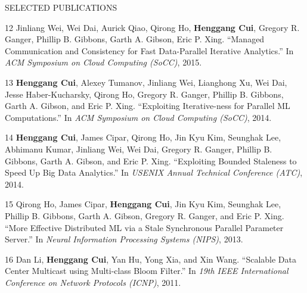 \documentclass{resume} %
\begin{document}
\begin{rSection}{SELECTED PUBLICATIONS}
{    \item
    [12]
        Jinliang Wei, Wei Dai, Aurick Qiao, Qirong Ho, {\bf Henggang Cui}, Gregory R. Ganger, Phillip B. Gibbons, Garth A. Gibson, Eric P. Xing.
        ``Managed Communication and Consistency for Fast Data-Parallel Iterative Analytics.''
        In \emph{ACM Symposium on Cloud Computing (SoCC)}, 2015.
    \item
    [13]
        {\bf Henggang Cui}, Alexey Tumanov, Jinliang Wei, Lianghong Xu, Wei Dai, Jesse Haber-Kucharsky, Qirong Ho, Gregory R. Ganger, Phillip B. Gibbons, Garth A. Gibson, and Eric P. Xing.
        ``Exploiting Iterative-ness for Parallel ML Computations.''
        In \emph{ACM Symposium on Cloud Computing (SoCC)}, 2014.
    \item
    [14]
        {\bf Henggang Cui}, James Cipar, Qirong Ho, Jin Kyu Kim, Seunghak Lee, Abhimanu Kumar, Jinliang Wei, Wei Dai, Gregory R. Ganger, Phillip B. Gibbons, Garth A. Gibson, and Eric P. Xing.
        ``Exploiting Bounded Staleness to Speed Up Big Data Analytics.''
        In \emph{USENIX Annual Technical Conference (ATC)}, 2014.
    \item
    [15]
        Qirong Ho, James Cipar, {\bf Henggang Cui}, Jin Kyu Kim, Seunghak Lee, Phillip B. Gibbons, Garth A. Gibson, Gregory R. Ganger, and Eric P. Xing.
        ``More Effective Distributed ML via a Stale Synchronous Parallel Parameter Server.''
        In \emph{Neural Information Processing Systems (NIPS)}, 2013.
    \item
    [16]
        Dan Li, {\bf Henggang Cui}, Yan Hu, Yong Xia, and Xin Wang.
        ``Scalable Data Center Multicast using Multi-class Bloom Filter.''
        In \emph{19th IEEE International Conference on Network Protocols (ICNP)}, 2011.
}
\end{rSection}
\vspace{-.05in}
\end{document}
